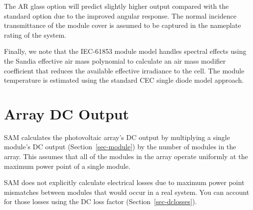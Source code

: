 \documentclass[12pt,letterpaper]{article}
\begin{document}
The AR glass option will predict slightly higher output compared with the standard option due to the improved angular response.  The normal incidence transmittance of the module cover is assumed to be captured in the nameplate rating of the system. 

Finally, we note that the IEC-61853 module model handles spectral effects using the Sandia effective air mass polynomial to calculate an air mass modifier coefficient that reduces the available effective irradiance to the cell. The module temperature is estimated using the standard CEC single diode model approach.

\chapter{Array DC Output}\label{sec-arraydcoutput}

SAM calculates the photovoltaic array's DC output by multiplying a single module's DC output (Section~\ref{sec-module}) by the number of modules in the array. This assumes that all of the modules in the array operate uniformly at the maximum power point of a single module. 

SAM does not explicitly calculate electrical losses due to maximum power point mismatches between modules that would occur in a real system. You can account for those losses using the DC loss factor (Section~\ref{sec-dclosses}).
\end{document}
